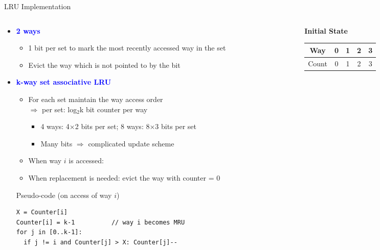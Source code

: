 \documentclass[aspectratio=169,12pt]{beamer}
\begin{document}
\begin{frame}[fragile]{LRU Implementation}
\begin{columns}[T]
\begin{column}{0.70\textwidth}
\begin{itemize}
  \item \textcolor{blue}{\textbf{2 ways}}
  \begin{itemize}
    \item 1 bit per set to mark the most recently accessed way in the set
    \item Evict the way which is not pointed to by the bit
  \end{itemize}
  
  \item \textcolor{blue}{\textbf{k-way set associative LRU}}
  \begin{itemize}
    \item For each set maintain the way access order \\
    $\Rightarrow$ per set: log$_2$k bit counter per way
    \begin{itemize}
      \item 4 ways: 4$\times$2 bits per set; 8 ways: 8$\times$3 bits per set
      \item Many bits $\Rightarrow$ complicated update scheme
    \end{itemize}
    \item When way $i$ is accessed:
    \item When replacement is needed: evict the way with counter = 0
  \end{itemize}
  
  \begin{block}{Pseudo-code (on access of way $i$)}
  \begin{lstlisting}[basicstyle=\ttfamily\small]
X = Counter[i]
Counter[i] = k-1          // way i becomes MRU
for j in [0..k-1]:
  if j != i and Counter[j] > X: Counter[j]--
  \end{lstlisting}
  \end{block}
\end{itemize}
\end{column}

\begin{column}{0.30\textwidth}
\small
\raggedright
\textbf{Initial State}\\
\vspace{0.1cm}
\begin{tabular}{|c|c|c|c|c|}
\hline
Way & 0 & 1 & 2 & 3 \\
\hline
Count & 0 & 1 & 2 & 3 \\
\hline
\end{tabular}


\end{column}
\end{columns}
\end{frame}
\end{document}
